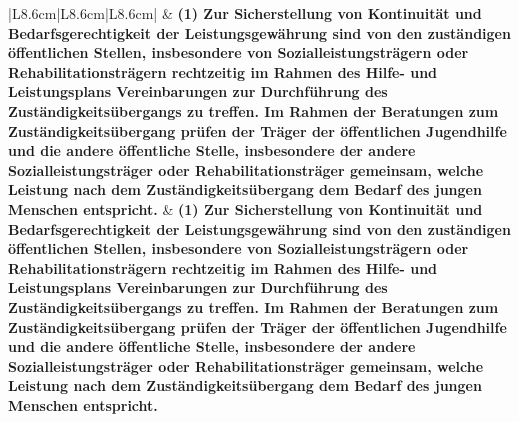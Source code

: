 \documentclass[10pt,a4paper,landscape]{article}
\begin{document}
\begin{longtable}{|L{8.6cm}|L{8.6cm}|L{8.6cm}|}
 & \textbf{(1) Zur Sicherstellung von Kontinuität und Bedarfsgerechtigkeit der Leistungsgewährung sind von den zuständigen öffentlichen Stellen, insbesondere von Sozialleistungsträgern oder Rehabilitationsträgern rechtzeitig im Rahmen des Hilfe- und Leistungsplans Vereinbarungen zur Durchführung des Zuständigkeitsübergangs zu treffen. Im Rahmen der Beratungen zum Zuständigkeitsübergang prüfen der Träger der öffentlichen Jugendhilfe und die andere öffentliche Stelle, insbesondere der andere Sozialleistungsträger oder Rehabilitationsträger gemeinsam, welche Leistung nach dem Zuständigkeitsübergang dem Bedarf des jungen Menschen entspricht. } & \textbf{(1) Zur Sicherstellung von Kontinuität und Bedarfsgerechtigkeit der Leistungsgewährung sind von den zuständigen öffentlichen Stellen, insbesondere von Sozialleistungsträgern oder Rehabilitationsträgern rechtzeitig im Rahmen des Hilfe- und Leistungsplans Vereinbarungen zur Durchführung des Zuständigkeitsübergangs zu treffen. Im Rahmen der Beratungen zum Zuständigkeitsübergang prüfen der Träger der öffentlichen Jugendhilfe und die andere öffentliche Stelle, insbesondere der andere Sozialleistungsträger oder Rehabilitationsträger gemeinsam, welche Leistung nach dem Zuständigkeitsübergang dem Bedarf des jungen Menschen entspricht. } \\
\hline

\end{longtable}
\end{document}
